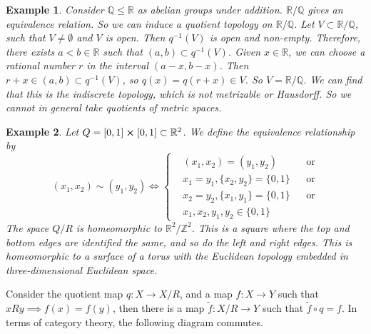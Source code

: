 \documentclass{article}
\theoremstyle{plain}\theoremheaderfont{\normalfont\itshape}\theorembodyfont{\rmfamily}\theoremseparator{.}\newtheorem*{rem}{Remark}\newtheorem*{ex}{Example}\newtheorem*{proof}{Proof}\newtheorem*{altp}{Alternative proof}
\theoremstyle{plain}\theoremheaderfont{\normalfont\bfseries}\theorembodyfont{\rmfamily}\theoremseparator{.}\newtheorem{thm}{Theorem}[section]\newtheorem{lem}[thm]{Lemma}\newtheorem{prop}[thm]{Proposition}\newtheorem*{cor}{Corollary}\newtheorem{defn}[thm]{Definition}\newtheorem{clm}[thm]{Claim}\newtheorem{clminproof}{Claim}
\theoremstyle{break}\theoremheaderfont{\normalfont\itshape}\theorembodyfont{\rmfamily}\theoremseparator{.\medskip}\newtheorem*{proofskip}{Proof}\newtheorem*{exs}{Examples}\newtheorem*{rems}{Remarks}
\theoremstyle{break}\theoremheaderfont{\normalfont\bfseries}\theorembodyfont{\rmfamily}\theoremseparator{.\medskip}\newtheorem{lemskip}[thm]{Lemma}\newtheorem{defnskip}[thm]{Definition}\newtheorem{propskip}[thm]{Proposition}\newtheorem{thmskip}[thm]{Theorem}
\begin{document}
    \begin{ex}
        Consider \(\mathbb{Q}\le\mathbb{R}\) as abelian groups under addition. \(\mathbb{R}/\mathbb{Q}\) gives an equivalence relation. So we can induce a quotient topology on \(\mathbb{R}/\mathbb{Q}\). Let \(V\subset\mathbb{R}/\mathbb{Q}\), such that \(V\ne\emptyset\) and \(V\) is open. Then \(q^{-1}(V)\) is open and non-empty. Therefore, there exists \(a<b\in\mathbb{R}\) such that \((a,b)\subset q^{-1}(V)\). Given \(x\in\mathbb{R}\), we can choose a rational number \(r\) in the interval \((a-x,b-x)\). Then \(r+x\in(a,b)\subset q^{-1}(V)\), so \(q(x)=q(r+x)\in V\). So \(V=\mathbb{R}/\mathbb{Q}\). We can find that this is the indiscrete topology, which is not metrizable or Hausdorff. So we cannot in general take quotients of metric spaces.
    \end{ex}

    \begin{ex}
        Let \(Q=[0,1]\cross[0,1]\subset\mathbb{R}^2\). We define the equivalence relationship by
        \[(x_1,x_2)\sim(y_1,y_2)\iff\left\{\begin{aligned}
            &(x_1,x_2)=(y_1,y_2) && \text{or}\\
            & x_1=y_1,\{x_2,y_2\}=\{0,1\} && \text{or}\\
            & x_2=y_2,\{x_1,y_1\}=\{0,1\} && \text{or}\\
            & x_1,x_2,y_1,y_2\in\{0,1\}
        \end{aligned}\right.\]
        The space \(Q/R\) is homeomorphic to \(\mathbb{R}^2/\mathbb{Z}^2\). This is a square where the top and bottom edges are identified the same, and so do the left and right edges. This is homeomorphic to a surface of a torus with the Euclidean topology embedded in three-dimensional Euclidean space.
    \end{ex}

    Consider the quotient map \(q:X\to X/R\), and a map \(f:X\to Y\) such that \(xRy\implies f(x)=f(y)\), then there is a map \(\tilde{f}:X/R\to Y\) such that \(\tilde{f}\circ q=f\). In terms of category theory, the following diagram commutes.
    \begin{center}
    \end{center}
\end{document}
